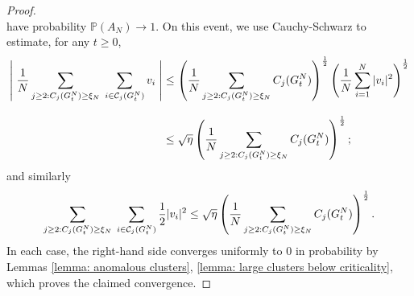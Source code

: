 \documentclass[11pt, notitlepage]{article}
\begin{document}
\begin{proof}
\begin{equation}
    \end{equation} have probability $\mathbb{P}(A_N)\rightarrow 1$. On this event, we use Cauchy-Schwarz to estimate, for any $t\ge 0$, \begin{equation}\begin{split} \label{eq: use of CS 1}\left|\hspace{0.1cm}\frac{1}{N}\sum_{j\geq 2: C_j(G^N_t)\geq \xi_N} \hspace{0.1cm}\sum_{i \in \mathcal{C}_j(G^N_t)} v_i \hspace{0.1cm}\right| & \leq \left(\frac{1}{N}\sum_{j\geq 2: C_j(G^N_t)\geq \xi_N} C_j(G^N_t)\right)^\frac{1}{2}\left(\frac{1}{N}\sum_{i=1}^N |v_i|^2\right)^\frac{1}{2} \\[2ex] & \le  \sqrt{\eta}\left(\frac{1}{N}\sum_{j\geq 2: C_j(G^N_t)\geq \xi_N} C_j(G^N_t)\right)^\frac{1}{2}; \end{split} \end{equation} and similarly \begin{equation} \label{eq: use of CS 2} \begin{split} \sum_{j\geq 2: C_j(G^N_t)\geq \xi_N} \hspace{0.1cm}\sum_{i \in \mathcal{C}_j(G^N_t)} \frac{1}{2}|v_i|^2 \leq \sqrt{\eta}\left(\frac{1}{N}\sum_{j\geq 2: C_j(G^N_t)\geq \xi_N} C_j(G^N_t)\right)^\frac{1}{2}. \end{split}\end{equation} In each case, the right-hand side converges uniformly to $0$ in probability by Lemmas \ref{lemma: anomalous clusters}, \ref{lemma: large clusters below criticality}, which proves the claimed convergence. \end{proof} 
\end{document}

